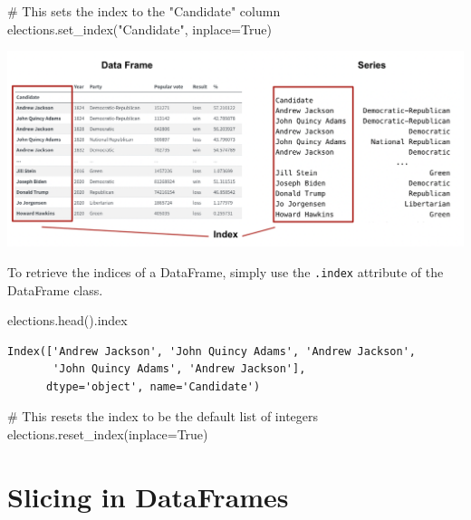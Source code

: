 \documentclass[
  letterpaper,
  DIV=11,
  numbers=noendperiod]{scrreprt}
\newenvironment{Shaded}{\begin{snugshade}}{\end{snugshade}}
\newcommand{\CommentTok}[1]{\textcolor[rgb]{0.37,0.37,0.37}{#1}}
\newcommand{\NormalTok}[1]{\textcolor[rgb]{0.00,0.23,0.31}{#1}}
\newcommand{\OperatorTok}[1]{\textcolor[rgb]{0.37,0.37,0.37}{#1}}
\newcommand{\StringTok}[1]{\textcolor[rgb]{0.13,0.47,0.30}{#1}}
\newcommand{\VariableTok}[1]{\textcolor[rgb]{0.07,0.07,0.07}{#1}}
\begin{document}
\begin{Shaded}
\begin{Highlighting}[]
\CommentTok{\# This sets the index to the "Candidate" column}
\NormalTok{elections.set\_index(}\StringTok{"Candidate"}\NormalTok{, inplace}\OperatorTok{=}\VariableTok{True}\NormalTok{)}
\end{Highlighting}
\end{Shaded}

\includegraphics{pandas_1/images/index_comparison_2.png}

To retrieve the indices of a DataFrame, simply use the \texttt{.index}
attribute of the DataFrame class.

\begin{Shaded}
\begin{Highlighting}[]
\NormalTok{elections.head().index}
\end{Highlighting}
\end{Shaded}

\begin{verbatim}
Index(['Andrew Jackson', 'John Quincy Adams', 'Andrew Jackson',
       'John Quincy Adams', 'Andrew Jackson'],
      dtype='object', name='Candidate')
\end{verbatim}

\begin{Shaded}
\begin{Highlighting}[]
\CommentTok{\# This resets the index to be the default list of integers}
\NormalTok{elections.reset\_index(inplace}\OperatorTok{=}\VariableTok{True}\NormalTok{) }
\end{Highlighting}
\end{Shaded}

\hypertarget{slicing-in-dataframes}{%
\section{Slicing in DataFrames}\label{slicing-in-dataframes}}
\end{document}
